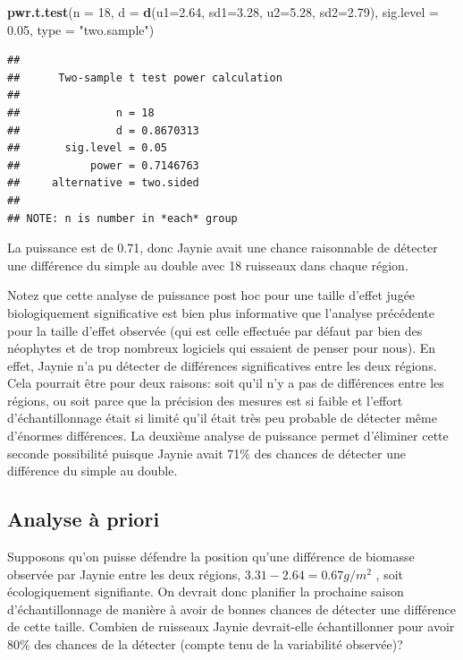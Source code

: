 \documentclass[12pt,]{book}
\newenvironment{Shaded}{\begin{snugshade}}{\end{snugshade}}
\newcommand{\DataTypeTok}[1]{\textcolor[rgb]{0.27,0.27,0.27}{#1}}
\newcommand{\DecValTok}[1]{\textcolor[rgb]{0.06,0.06,0.06}{#1}}
\newcommand{\FloatTok}[1]{\textcolor[rgb]{0.06,0.06,0.06}{#1}}
\newcommand{\KeywordTok}[1]{\textcolor[rgb]{0.27,0.27,0.27}{\textbf{#1}}}
\newcommand{\NormalTok}[1]{#1}
\newcommand{\StringTok}[1]{\textcolor[rgb]{0.5,0.5,0.5}{#1}}
\begin{document}
\begin{Shaded}
\begin{Highlighting}[]
\KeywordTok{pwr.t.test}\NormalTok{(}\DataTypeTok{n =} \DecValTok{18}\NormalTok{, }\DataTypeTok{d =} \KeywordTok{d}\NormalTok{(}\DataTypeTok{u1=}\FloatTok{2.64}\NormalTok{, }\DataTypeTok{sd1=}\FloatTok{3.28}\NormalTok{, }\DataTypeTok{u2=}\FloatTok{5.28}\NormalTok{, }\DataTypeTok{sd2=}\FloatTok{2.79}\NormalTok{), }\DataTypeTok{sig.level =} \FloatTok{0.05}\NormalTok{, }\DataTypeTok{type =} \StringTok{"two.sample"}\NormalTok{)}
\end{Highlighting}
\end{Shaded}

\begin{verbatim}
## 
##      Two-sample t test power calculation 
## 
##               n = 18
##               d = 0.8670313
##       sig.level = 0.05
##           power = 0.7146763
##     alternative = two.sided
## 
## NOTE: n is number in *each* group
\end{verbatim}

La puissance est de 0.71, donc Jaynie avait une chance raisonnable de détecter une différence du simple au double avec 18 ruisseaux dans chaque région.

Notez que cette analyse de puissance post hoc pour une taille d'effet jugée biologiquement significative est bien plus informative que l'analyse précédente pour la taille d'effet observée (qui est celle effectuée par défaut par bien des néophytes et de trop nombreux logiciels qui essaient de penser pour nous).
En effet, Jaynie n'a pu détecter de différences significatives entre les deux régions.
Cela pourrait être pour deux raisons: soit qu'il n'y a pas de différences entre les régions, ou soit parce que la précision des mesures est si faible et l'effort d'échantillonnage était si limité qu'il était très peu probable de détecter même d'énormes différences.
La deuxième analyse de puissance permet d'éliminer cette seconde possibilité puisque Jaynie avait 71\% des chances de détecter une différence du simple au double.

\hypertarget{analyse-uxe0-priori}{%
\subsection{Analyse à priori}\label{analyse-uxe0-priori}}

Supposons qu'on puisse défendre la position qu'une différence de biomasse observée par Jaynie entre les deux régions, \(3.31- 2.64=0.67g/m^2\) , soit écologiquement signifiante.
On devrait donc planifier la prochaine saison d'échantillonnage de manière à avoir de bonnes chances de détecter une différence de cette taille.
Combien de ruisseaux Jaynie devrait-elle échantillonner pour avoir 80\% des chances de la détecter (compte tenu de la variabilité observée)?
\end{document}
